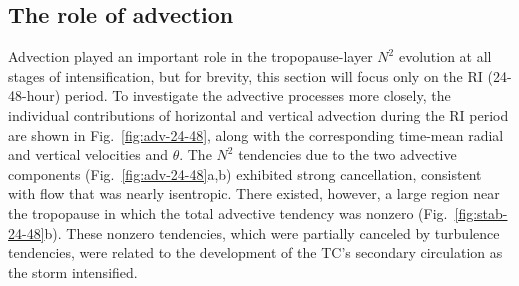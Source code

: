 \documentclass{ametsoc}
\begin{document}
  \subsection{The role of advection}

Advection played an important role in the tropopause-layer $N^2$ evolution at all stages of intensification, but for brevity, this section will focus only on the RI (24-48-hour) period.
To investigate the advective processes more closely, the individual contributions of horizontal and vertical advection during the RI period are shown in Fig.~\ref{fig:adv-24-48}, along with the corresponding time-mean radial and vertical velocities and $\theta$.
The $N^2$ tendencies due to the two advective components (Fig.~\ref{fig:adv-24-48}a,b) exhibited strong cancellation, consistent with flow that was nearly isentropic.
There existed, however, a large region near the tropopause in which the total advective tendency was nonzero (Fig.~\ref{fig:stab-24-48}b).
These nonzero tendencies, which were partially canceled by turbulence tendencies, were related to the development of the TC's secondary circulation as the storm intensified.




\end{document}
